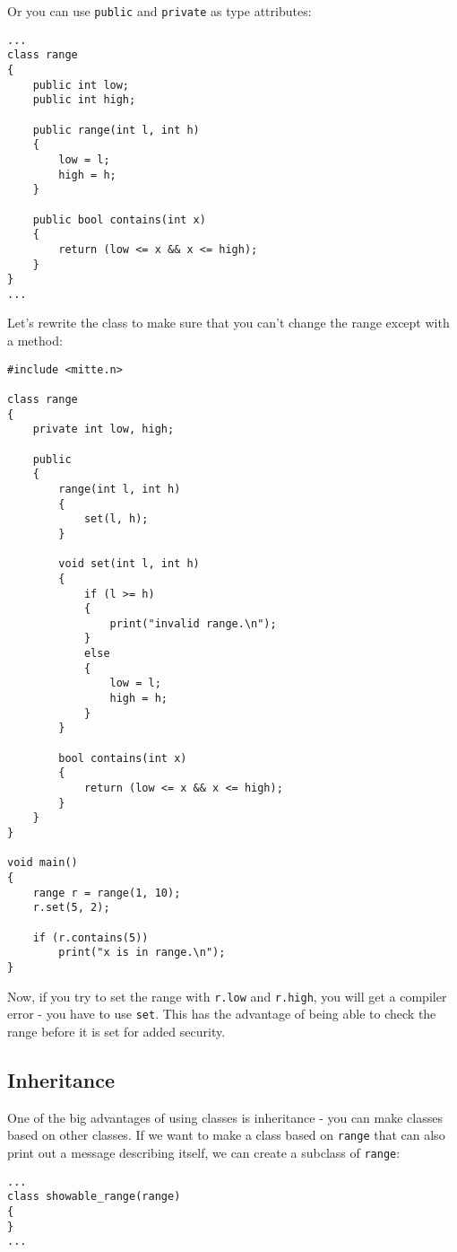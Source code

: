 \documentclass[10pt,a4paper]{article}
\begin{document}
Or you can use \verb|public| and \verb|private| as type attributes:
\begin{verbatim}
...
class range
{
    public int low;
    public int high;
    
    public range(int l, int h)
    {
        low = l;
        high = h;
    }
    
    public bool contains(int x)
    {
        return (low <= x && x <= high);
    }
}
...
\end{verbatim}

Let's rewrite the class to make sure that you can't change the range except with a method:
\begin{verbatim}
#include <mitte.n>

class range
{
    private int low, high;
    
    public
    {
        range(int l, int h)
        {
            set(l, h);
        }
        
        void set(int l, int h)
        {
            if (l >= h)
            {
                print("invalid range.\n");
            }
            else
            {
                low = l;
                high = h;
            }
        }
        
        bool contains(int x)
        {
            return (low <= x && x <= high);
        }
    }
}

void main()
{
    range r = range(1, 10);
    r.set(5, 2);
    
    if (r.contains(5))
        print("x is in range.\n");
}
\end{verbatim}

Now, if you try to set the range with \verb|r.low| and \verb|r.high|, you will get a compiler error - you have to use \verb|set|. This has the advantage of being able to check the range before it is set for added security.

\newpage





\subsection{Inheritance}
One of the big advantages of using classes is inheritance - you can make classes based on other classes. If we want to make a class based on \verb|range| that can also print out a message describing itself, we can create a subclass of \verb|range|:
\begin{verbatim}
...
class showable_range(range)
{
}
...
\end{verbatim}
\end{document}
